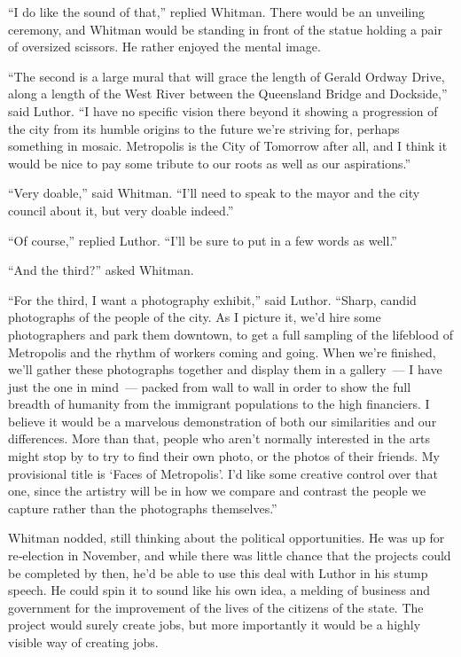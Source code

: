 \documentclass[ebook,12pt]{memoir}
\begin{document}
``I do like the sound of that,'' replied Whitman. There would be an
unveiling ceremony, and Whitman would be standing in front of the statue
holding a pair of oversized scissors. He rather enjoyed the mental
image.

``The second is a large mural that will grace the length of Gerald
Ordway Drive, along a length of the West River between the Queensland
Bridge and Dockside,'' said Luthor. ``I have no specific vision there
beyond it showing a progression of the city from its humble origins to
the future we're striving for, perhaps something in mosaic. Metropolis
is the City of Tomorrow after all, and I think it would be nice to pay
some tribute to our roots as well as our aspirations.''

``Very doable,'' said Whitman. ``I'll need to speak to the mayor and the
city council about it, but very doable indeed.''

``Of course,'' replied Luthor. ``I'll be sure to put in a few words as
well.''

``And the third?'' asked Whitman.

``For the third, I want a photography exhibit,'' said Luthor. ``Sharp,
candid photographs of the people of the city. As I picture it, we'd hire
some photographers and park them downtown, to get a full sampling of the
lifeblood of Metropolis and the rhythm of workers coming and going. When
we're finished, we'll gather these photographs together and display them
in a gallery~--- I have just the one in mind~--- packed from wall to
wall in order to show the full breadth of humanity from the immigrant
populations to the high financiers. I believe it would be a marvelous
demonstration of both our similarities and our differences. More than
that, people who aren't normally interested in the arts might stop by to
try to find their own photo, or the photos of their friends. My
provisional title is `Faces of Metropolis'. I'd like some creative
control over that one, since the artistry will be in how we compare and
contrast the people we capture rather than the photographs themselves.''

Whitman nodded, still thinking about the political opportunities. He was
up for re‐election in November, and while there was little chance that
the projects could be completed by then, he'd be able to use this deal
with Luthor in his stump speech. He could spin it to sound like his own
idea, a melding of business and government for the improvement of the
lives of the citizens of the state. The project would surely create
jobs, but more importantly it would be a highly visible way of creating
jobs.
\end{document}
